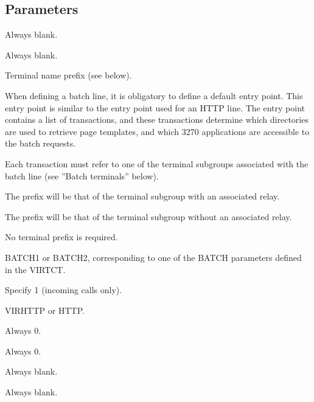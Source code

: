 \documentclass[letterpaper,10pt,english]{sphinxmanual}
\begin{document}
\sphinxAtStartPar
{}

\ignorespaces 

\subsection{Parameters}
\label{\detokenize{connectivity_guide:index-32}}\label{\detokenize{connectivity_guide:id10}}\begin{description}
\sphinxAtStartPar
Always blank.

\sphinxAtStartPar
Always blank.

\sphinxAtStartPar
Terminal name prefix (see below).

\sphinxAtStartPar
When defining a batch line, it is obligatory to define a default entry point. This entry point is similar to the entry point used for an HTTP line. The entry point contains a list of transactions, and these transactions determine which directories are used to retrieve page templates, and which 3270 applications are accessible to the batch requests.

\sphinxAtStartPar
Each transaction must refer to one of the terminal sub\sphinxhyphen{}groups associated with the batch line (see ”Batch terminals” below).
\begin{description}
\sphinxAtStartPar
The prefix will be that of the terminal sub\sphinxhyphen{}group with an associated relay.

\sphinxAtStartPar
The prefix will be that of the terminal sub\sphinxhyphen{}group without an associated relay.

\sphinxAtStartPar
No terminal prefix is required.

\end{description}

\sphinxAtStartPar
BATCH1 or BATCH2, corresponding to one of the BATCH parameters defined in the VIRTCT.

\sphinxAtStartPar
Specify 1 (incoming calls only).

\sphinxAtStartPar
VIRHTTP or HTTP.

\sphinxAtStartPar
Always 0.

\sphinxAtStartPar
Always 0.

\sphinxAtStartPar
Always blank.

\sphinxAtStartPar
Always blank.

\end{description}
\end{document}
